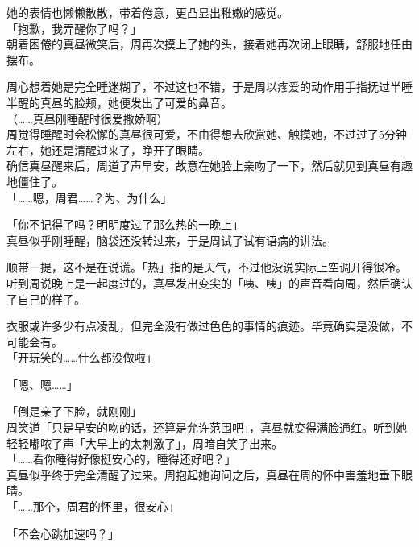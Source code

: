 她的表情也懒懒散散，带着倦意，更凸显出稚嫩的感觉。\\

「抱歉，我弄醒你了吗？」\\

朝着困倦的真昼微笑后，周再次摸上了她的头，接着她再次闭上眼睛，舒服地任由摆布。

周心想着她是完全睡迷糊了，不过这也不错，于是周以疼爱的动作用手指抚过半睡半醒的真昼的脸颊，她便发出了可爱的鼻音。\\

（……真昼刚睡醒时很爱撒娇啊）\\

周觉得睡醒时会松懈的真昼很可爱，不由得想去欣赏她、触摸她，不过过了5分钟左右，她还是清醒过来了，睁开了眼睛。\\

确信真昼醒来后，周道了声早安，故意在她脸上亲吻了一下，然后就见到真昼有趣地僵住了。\\

「……嗯，周君……？为、为什么」

「你不记得了吗？明明度过了那么热的一晚上」\\

真昼似乎刚睡醒，脑袋还没转过来，于是周试了试有语病的讲法。

顺带一提，这不是在说谎。「热」指的是天气，不过他没说实际上空调开得很冷。\\

听到周说晚上是一起度过的，真昼发出变尖的「咦、咦」的声音看向周，然后确认了自己的样子。

衣服或许多少有点凌乱，但完全没有做过色色的事情的痕迹。毕竟确实是没做，不可能会有。\\

「开玩笑的……什么都没做啦」

「嗯、嗯……」

「倒是亲了下脸，就刚刚」\\

周笑道「只是早安的吻的话，还算是允许范围吧」，真昼就变得满脸通红。听到她轻轻嘟哝了声「大早上的太刺激了」，周暗自笑了出来。\\

「……看你睡得好像挺安心的，睡得还好吧？」\\

真昼似乎终于完全清醒了过来。周抱起她询问之后，真昼在周的怀中害羞地垂下眼睛。\\

「……那个，周君的怀里，很安心」

「不会心跳加速吗？」

